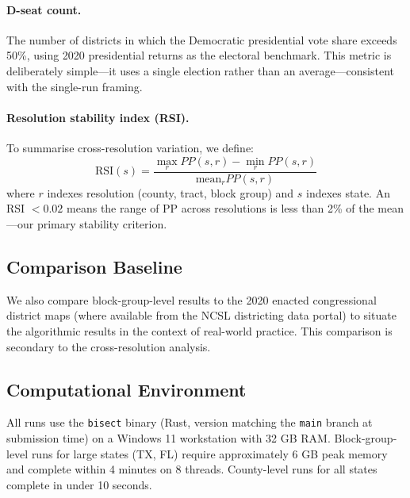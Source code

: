 \paragraph{D-seat count.}
The number of districts in which the Democratic presidential vote share
exceeds 50\%, using 2020 presidential returns as the electoral benchmark.
This metric is deliberately simple---it uses a single election rather than
an average---consistent with the single-run framing.

\paragraph{Resolution stability index (RSI).}
To summarise cross-resolution variation, we define:
\begin{equation}
  \text{RSI}(s) = \frac{\max_r PP(s, r) - \min_r PP(s, r)}{\text{mean}_r PP(s, r)}
\end{equation}
where $r$ indexes resolution (county, tract, block group) and $s$ indexes
state.  An RSI $< 0.02$ means the range of PP across resolutions is less
than 2\% of the mean---our primary stability criterion.

\subsection{Comparison Baseline}

We also compare block-group-level results to the 2020 enacted congressional
district maps (where available from the NCSL districting data portal) to
situate the algorithmic results in the context of real-world practice.
This comparison is secondary to the cross-resolution analysis.

\subsection{Computational Environment}

All runs use the \texttt{bisect} binary (Rust, version matching the
\texttt{main} branch at submission time) on a Windows 11 workstation with 32
GB RAM.  Block-group-level runs for large states (TX, FL) require
approximately 6 GB peak memory and complete within 4 minutes on 8 threads.
County-level runs for all states complete in under 10 seconds.
